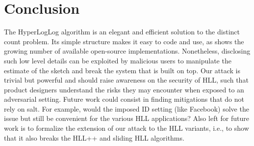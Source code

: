 \documentclass{IEEEtran}
\begin{document}
\section{Conclusion}\label{sec:conclusions}
The HyperLogLog algorithm is an elegant and efficient solution to the distinct count problem. Its simple structure makes it easy to code and use, as shows the growing number of available open-source implementations. Nonetheless, disclosing such low level details can be exploited by malicious users to manipulate the estimate of the sketch and break the system that is built on top. Our attack is trivial but powerful and should raise awareness on the security of HLL, such that product designers understand the risks they may encounter when exposed to an adversarial setting. Future work could consist in finding mitigations that do not rely on salt. For example, would the imposed ID setting (like Facebook) solve the issue but still be convenient for the various HLL applications? Also left for future work is to formalize the extension of our attack to the HLL variants, i.e., to show that it also breaks the HLL++ \cite{hllpratice} and sliding HLL \cite{slidinghll} algorithms.



\end{document}
